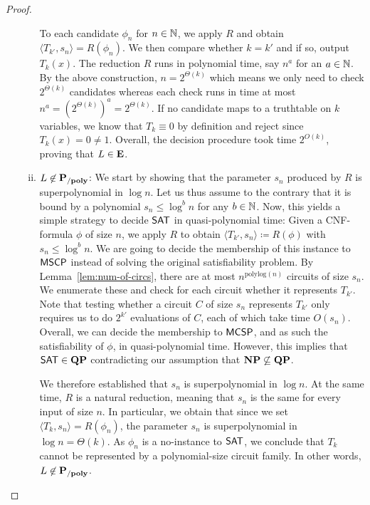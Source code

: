 \documentclass[11pt]{article}
\begin{document}
\begin{proof}
\begin{itemize}
\begin{enumerate}[(i)]
          To each candidate $\phi_n$ for $n \in {\mathbb{N}}$, we apply $R$ and obtain
          $\langle T_{k'}, s_n \rangle = R(\phi_n)$.
          We then compare whether $k = k'$ and if so, output $T_k(x)$.
          The reduction $R$ runs in polynomial time, say $n^a$ for an
          $a \in {\mathbb{N}}$.
          By the above construction, $n = 2^{\Theta(k)}$ which means we
          only need to check $2^{\Theta(k)}$ candidates whereas each check
          runs in time at most $n^a = (2^{\Theta(k)})^a = 2^{\Theta(k)}$.
          If no candidate maps to a truthtable on $k$ variables, we know
          that $T_k \equiv 0$ by definition and reject since
          $T_k(x) = 0 \not= 1$.
          Overall, the decision procedure took time $2^{O(k)}$, proving
          that $L \in \mathbf{E}$.

        \item $L \not\in \mathbf{P_{/poly}}$:
          We start by showing that the parameter $s_n$ produced by $R$ is
          superpolynomial in $\log n$.
          Let us thus assume to the contrary that it is bound by a polynomial
          $s_n \le \log^b n$ for any $b \in {\mathbb{N}}$.
          Now, this yields a simple strategy to decide $\mathsf{SAT}$ in
          quasi-polynomial time:
          Given a CNF-formula $\phi$ of size $n$, we apply
          $R$ to obtain $\langle T_{k'}, s_n \rangle \coloneqq R(\phi)$
          with $s_n \le \log^b n$.
          We are going to decide the membership of this instance to
          $\mathsf{MSCP}$ instead of solving
          the original satisfiability problem.
          By Lemma~\ref{lem:num-of-circs}, there are at most
          $n^{\mathrm{polylog}(n)}$ circuits of size $s_n$.
          We enumerate these and check for each circuit whether
          it represents $T_{k'}$.
          Note that testing whether a circuit $C$ of size $s_n$ represents
          $T_{k'}$ only requires us to do $2^{k'}$ evaluations of $C$, each of
          which take time $O(s_n)$.
          Overall, we can decide the membership to $\mathsf{MCSP}$, and
          as such the satisfiability of $\phi$, in quasi-polynomial time.
          However, this implies that $\mathsf{SAT} \in \mathbf{QP}$
          contradicting our assumption that $\mathbf{NP} \not\subseteq \mathbf{QP}$.

          We therefore established that $s_n$ is superpolynomial in $\log n$.
          At the same time, $R$ is a natural reduction, meaning that $s_n$ is
          the same for every input of size $n$.
          In particular, we obtain that since we set
          $\langle T_k, s_n \rangle = R(\phi_n)$, the parameter
          $s_n$ is superpolynomial in $\log n = \Theta(k)$.
          As $\phi_n$ is a no-instance to $\mathsf{SAT}$, we conclude that
          $T_k$ cannot be represented by a polynomial-size circuit family.
          In other words, $L \not\in \mathbf{P_{/poly}}$.
      \end{enumerate}
	\end{itemize}
\end{proof}
\end{document}
